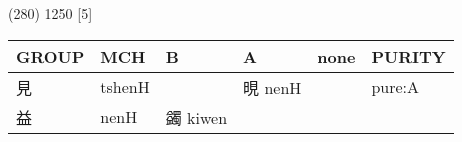 \documentclass[14pt,a4paper]{scrartcl}
\begin{document}
(280) 1250 {[}5{]}

\begin{longtable}[c]{@{}llllll@{}}
\toprule
\begin{minipage}[b]{0.14\columnwidth}\raggedright\strut
GROUP
\strut\end{minipage} &
\begin{minipage}[b]{0.14\columnwidth}\raggedright\strut
MCH
\strut\end{minipage} &
\begin{minipage}[b]{0.14\columnwidth}\raggedright\strut
B
\strut\end{minipage} &
\begin{minipage}[b]{0.14\columnwidth}\raggedright\strut
A
\strut\end{minipage} &
\begin{minipage}[b]{0.14\columnwidth}\raggedright\strut
none
\strut\end{minipage} &
\begin{minipage}[b]{0.14\columnwidth}\raggedright\strut
PURITY
\strut\end{minipage}\tabularnewline
\midrule
\endhead
\begin{minipage}[t]{0.14\columnwidth}\raggedright\strut
見
\strut\end{minipage} &
\begin{minipage}[t]{0.14\columnwidth}\raggedright\strut
tshenH
\strut\end{minipage} &
\begin{minipage}[t]{0.14\columnwidth}\raggedright\strut
\strut\end{minipage} &
\begin{minipage}[t]{0.14\columnwidth}\raggedright\strut
晛 nenH
\strut\end{minipage} &
\begin{minipage}[t]{0.14\columnwidth}\raggedright\strut
\strut\end{minipage} &
\begin{minipage}[t]{0.14\columnwidth}\raggedright\strut
pure:A
\strut\end{minipage}\tabularnewline
\begin{minipage}[t]{0.14\columnwidth}\raggedright\strut
益
\strut\end{minipage} &
\begin{minipage}[t]{0.14\columnwidth}\raggedright\strut
nenH
\strut\end{minipage} &
\begin{minipage}[t]{0.14\columnwidth}\raggedright\strut
蠲 kiwen
\strut\end{minipage} &

\end{longtable}
\end{document}

